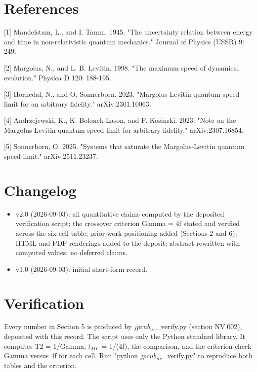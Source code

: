 \documentclass[11pt]{article}
\begin{document}
\section*{References}
[1] Mandelstam, L., and I. Tamm. 1945. "The uncertainty relation between energy and time in non-relativistic quantum mechanics." Journal of Physics (USSR) 9: 249.

[2] Margolus, N., and L. B. Levitin. 1998. "The maximum speed of dynamical evolution." Physica D 120: 188-195.

[3] Hornedal, N., and O. Sonnerborn. 2023. "Margolus-Levitin quantum speed limit for an arbitrary fidelity." arXiv:2301.10063.

[4] Andrzejewski, K., K. Bolonek-Lason, and P. Kosinski. 2023. "Note on the Margolus-Levitin quantum speed limit for arbitrary fidelity." arXiv:2307.16854.

[5] Sonnerborn, O. 2025. "Systems that saturate the Margolus-Levitin quantum speed limit." arXiv:2511.23237.

\section*{Changelog}
\begin{itemize}
  \item v2.0 (2026-09-03): all quantitative claims computed by the deposited verification script; the crossover criterion Gamma = 4f stated and verified across the six-cell table; prior-work positioning added (Sections 2 and 6); HTML and PDF renderings added to the deposit; abstract rewritten with computed values, no deferred claims.
  \item v1.0 (2026-09-03): initial short-form record.
\end{itemize}
\section*{Verification}
Every number in Section 5 is produced by $jpcub_{nv}$\_verify.py (section NV.002), deposited with this record. The script uses only the Python standard library. It computes T2 = 1/Gamma, $t_{ML}$ = 1/(4f), the comparison, and the criterion check Gamma versus 4f for each cell. Run "python $jpcub_{nv}$\_verify.py" to reproduce both tables and the criterion.
\end{document}
